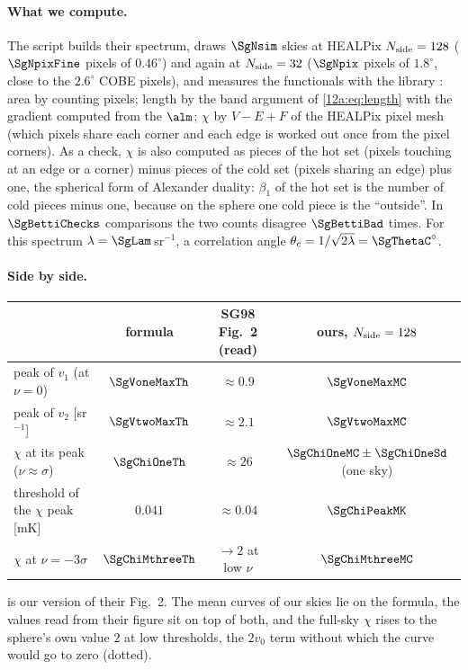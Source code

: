 \paragraph{What we compute.} The script  builds their spectrum,
\noindent draws $\SgNsim$ skies at HEALPix $N_{\rm side}=128$ ($\SgNpixFine$ pixels of $0.46^\circ$) and again at
$N_{\rm side}=32$ ($\SgNpix$ pixels of $1.8^\circ$, close to the $2.6^\circ$ COBE pixels), and measures the functionals
with the library : area by counting pixels; length by the band argument of
\eqref{12a:eq:length} with the gradient computed from the $\alm$; $\chi$ by $V-E+F$ of the HEALPix pixel mesh (which
pixels share each corner and each edge is worked out once from the pixel corners). As a check, $\chi$ is also
computed as pieces of the hot set (pixels touching at an edge or a corner) minus pieces of the cold set (pixels
sharing an edge) plus one, the spherical form of Alexander duality: $\beta_1$ of the hot set is the number of cold
pieces minus one, because on the sphere one cold piece is the ``outside''. In $\SgBettiChecks$ comparisons the two
counts disagree $\SgBettiBad$ times. For this spectrum $\lambda=\SgLam$\,sr$^{-1}$, a correlation angle
$\theta_c=1/\sqrt{2\lambda}=\SgThetaC^\circ$.

\paragraph{Side by side.}
\begin{center}
\small
\begin{tabular}{lccc}
\toprule
 & formula & SG98 Fig.~2 (read) & ours, $N_{\rm side}=128$ \\
\midrule
peak of $v_1$ (at $\nu=0$)            & $\SgVoneMaxTh$ & $\approx0.9$ & $\SgVoneMaxMC$\\
peak of $v_2$ [sr$^{-1}$]             & $\SgVtwoMaxTh$ & $\approx2.1$ & $\SgVtwoMaxMC$\\
$\chi$ at its peak ($\nu\approx\sigma$) & $\SgChiOneTh$ & $\approx26$  & $\SgChiOneMC\pm\SgChiOneSd$ (one sky)\\
threshold of the $\chi$ peak [mK]     & $0.041$ & $\approx0.04$ & $\SgChiPeakMK$\\
$\chi$ at $\nu=-3\sigma$              & $\SgChiMthreeTh$ & $\to2$ at low $\nu$ & $\SgChiMthreeMC$\\
\bottomrule
\end{tabular}
\end{center}
 is our version of their Fig.~2. The mean curves of our skies lie on the formula, the
values read from their figure sit on top of both, and the full-sky $\chi$ rises to the sphere's own value
$2$ at low thresholds, the $2v_0$ term without which the curve would go to zero (dotted).


